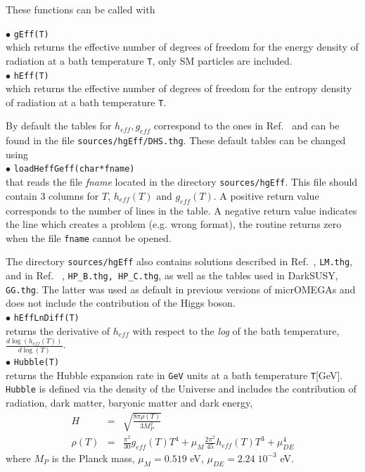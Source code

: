 \documentclass[12pt,a4paper]{article}
\begin{document}
These functions  can be called with  

\noindent$\bullet$ \verb|gEff(T)|\\
 which returns the effective number of degrees of freedom for the energy density of radiation at a bath temperature \verb|T|,  only SM particles are
included.
 \\
\noindent$\bullet$ \verb|hEff(T)|\\ which returns the effective number of degrees of freedom for the entropy density of radiation at a bath temperature
\verb|T|.
%

By default the tables for  $h_{eff}, g_{eff}$ correspond to the ones in Ref.~\cite{Drees:2015exa} and can be found in the file \verb|sources/hgEff/DHS.thg|.
These default tables can be changed using  \\
%
\noindent$\bullet$ \verb|loadHeffGeff(char*fname)|\\
that  reads  the file {\it fname}   located in the directory {\tt sources/hgEff}. This file should 
 contain  3 columns for $T$, $h_{eff}(T)$ and $g_{eff}(T)$. 
A positive  return value corresponds to the number of lines in the table. A negative return value indicates the line which creates a problem (e.g. wrong format), the routine returns zero when the file \verb|fname| cannot be opened.

The  directory  {\tt sources/hgEff}  also contains solutions described in Ref.~\cite{Laine:2015kra}, {\tt LM.thg},  and in Ref.~ \cite{Hindmarsh:2005ix},  {\tt HP\_B.thg, HP\_C.thg},  as well as the tables used in DarkSUSY, {\tt GG.thg}. The latter  was  used as default in  previous versions of
micrOMEGAs and does not include the contribution of the Higgs boson. 
\\
\noindent$\bullet$ \verb|hEffLnDiff(T)|\\ returns the derivative of $h_{eff}$ with respect to the
 {\it log} of the bath temperature, $\frac{d\log(h_{eff}(T))}{d\log(T)}$.\\
\noindent$\bullet$ \verb|Hubble(T)|\\ returns the Hubble expansion rate in
{\tt GeV} units   at a bath temperature \verb|T|[GeV].
{\tt Hubble} is defined via  the density of the  Universe  and includes the contribution of radiation,
dark matter, baryonic matter and dark energy,
\begin{eqnarray}
   H&=& \sqrt{\frac{8\pi \rho(T)}{ 3 M_P^2}}    \\
   \rho(T)&=&  \frac{\pi^2}{30} g_{eff}(T) T^4 + \mu_{M}\frac{2\pi^2}{45} h_{eff}(T) T^3 + \mu_{DE}^4 
   \label{eq:H}
\end{eqnarray}
where $M_P$   is the Planck mass,  $\mu_{M}=0.519$ eV,   $\mu_{DE}=2.24\;10^{-3}$ eV.
\end{document}
